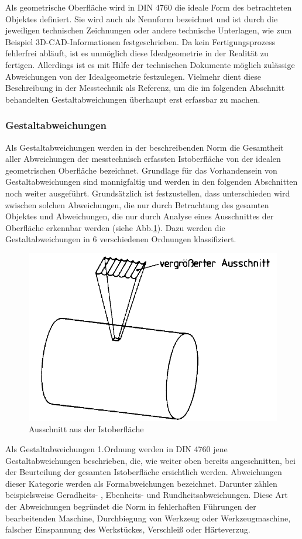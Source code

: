 Als geometrische Oberfläche wird in DIN 4760 die ideale Form des betrachteten Objektes definiert. Sie wird auch als Nennform bezeichnet und ist durch die jeweiligen technischen Zeichnungen oder andere technische Unterlagen, wie zum Beispiel 3D-CAD-Informationen festgeschrieben. Da kein Fertigungsprozess fehlerfrei abläuft, ist es unmöglich diese Idealgeometrie in der Realität zu fertigen. Allerdings ist es mit Hilfe der technischen Dokumente möglich zulässige Abweichungen von der Idealgeometrie festzulegen. Vielmehr dient diese Beschreibung in der Messtechnik als Referenz, um die im folgenden Abschnitt behandelten Gestaltabweichungen überhaupt erst erfassbar zu machen.             

     
\subsubsection{Gestaltabweichungen}

Als Gestaltabweichungen werden in der beschreibenden Norm die Gesamtheit aller Abweichungen der messtechnisch erfassten Istoberfläche von der idealen geometrischen Oberfläche bezeichnet. Grundlage für das Vorhandensein von Gestaltabweichungen sind mannigfaltig und werden in den folgenden Abschnitten noch weiter ausgeführt. Grundsätzlich ist festzustellen, dass unterschieden wird zwischen solchen Abweichungen, die nur durch Betrachtung des gesamten Objektes und Abweichungen, die nur durch Analyse eines Ausschnittes der Oberfläche erkennbar werden (siehe Abb.\ref{fig:din4760_1}). Dazu werden die Gestaltabweichungen in 6 verschiedenen Ordnungen klassifiziert. 


\begin{figure}[h]
	\centering
	\includegraphics[width=0.5\linewidth]{img/DIN_4760_1}
	\caption[Ausschnitt aus der Istoberfläche für die Beurteilung der Gestaltabweichung]{Ausschnitt aus der Istoberfläche}
	\label{fig:din4760_1}
\end{figure}

Als Gestaltabweichungen 1.Ordnung werden in DIN 4760 jene Gestaltabweichungen beschrieben, die, wie weiter oben bereits angeschnitten, bei der Beurteilung der gesamten Istoberfläche ersichtlich werden. Abweichungen dieser Kategorie werden als Formabweichungen bezeichnet. Darunter zählen beispielsweise Geradheits- , Ebenheits- und Rundheitsabweichungen. Diese Art der Abweichungen begründet die Norm in fehlerhaften Führungen der bearbeitenden Maschine, Durchbiegung von Werkzeug oder Werkzeugmaschine, falscher Einspannung des Werkstückes, Verschleiß oder Härteverzug.

